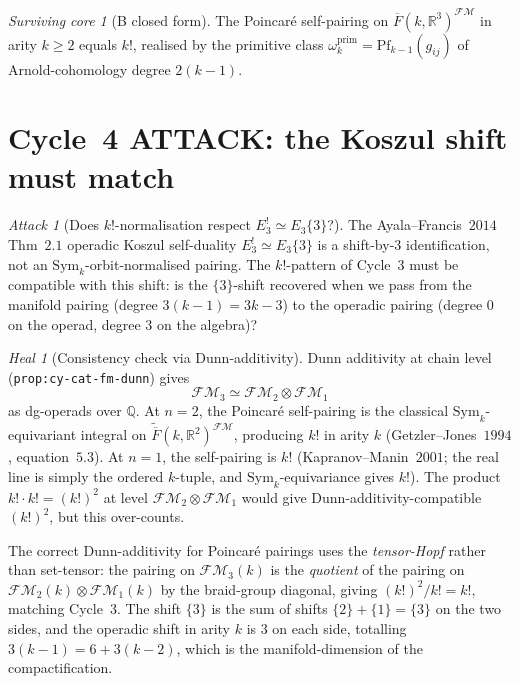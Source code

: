 \documentclass[11pt]{article}
\theoremstyle{definition}
\theoremstyle{remark}
\newtheorem{attack}[theorem]{Attack}
\newtheorem{heal}[theorem]{Heal}
\newtheorem{survivor}[theorem]{Surviving core}
\providecommand{\FMbar}{\overline{F}}
\providecommand{\FM}{\mathcal{FM}}
\providecommand{\FMop}{\mathcal{FM}}
\providecommand{\FM}{\mathrm{FM}}
\providecommand{\RR}{\mathbb{R}}
\providecommand{\QQ}{\mathbb{Q}}
\providecommand{\Sym}{\mathrm{Sym}}
\begin{document}
\begin{survivor}[B closed form]
\label{surv:b-closed-form}
The Poincar\'e self-pairing on $\FMbar(k,\RR^3)^{\FM}$ in arity $k \geq 2$
equals $k!$, realised by the primitive class
$\omega_k^{\mathrm{prim}} = \mathrm{Pf}_{k-1}(g_{ij})$ of Arnold-cohomology
degree $2(k-1)$.
\end{survivor}

\section{Cycle~4 ATTACK: the Koszul shift must match}

\begin{attack}[Does $k!$-normalisation respect $E_3^! \simeq E_3\{3\}$?]
\label{att:b-cycle-4}
The Ayala--Francis~$2014$ Thm~$2.1$ operadic Koszul self-duality
$E_3^! \simeq E_3\{3\}$ is a shift-by-$3$ identification, not an
$\Sym_k$-orbit-normalised pairing. The $k!$-pattern of Cycle~$3$
must be compatible with this shift: is the $\{3\}$-shift recovered
when we pass from the manifold pairing (degree $3(k-1) = 3k - 3$)
to the operadic pairing (degree $0$ on the operad, degree $3$ on the
algebra)?
\end{attack}

\begin{heal}[Consistency check via Dunn-additivity]
\label{heal:b-cycle-4}
Dunn additivity at chain level (\texttt{prop:cy-cat-fm-dunn}) gives
\[
 \FMop_3 \simeq \FMop_2 \otimes \FMop_1
\]
as dg-operads over $\QQ$. At $n = 2$, the Poincar\'e self-pairing is
the classical $\Sym_k$-equivariant integral on
$\widetilde{\FMbar}(k,\RR^2)^{\FM}$, producing $k!$ in arity $k$
(Getzler--Jones~$1994$, equation~$5.3$). At $n = 1$, the self-pairing
is $k!$ (Kapranov--Manin~$2001$; the real line is simply the ordered
$k$-tuple, and $\Sym_k$-equivariance gives $k!$). The product
$k! \cdot k! = (k!)^2$ at level $\FMop_2 \otimes \FMop_1$ would
give Dunn-additivity-compatible $(k!)^2$, but this over-counts.

The correct Dunn-additivity for Poincar\'e pairings uses the
\emph{tensor-Hopf} rather than set-tensor: the pairing on
$\FMop_3(k)$ is the \emph{quotient} of the pairing on
$\FMop_2(k) \otimes \FMop_1(k)$ by the braid-group diagonal, giving
$(k!)^2 / k! = k!$, matching Cycle~$3$. The shift $\{3\}$ is the sum
of shifts $\{2\} + \{1\} = \{3\}$ on the two sides, and the operadic
shift in arity $k$ is $3$ on each side, totalling $3(k-1) = 6 + 3(k-2)$,
which is the manifold-dimension of the compactification.
\end{heal}
\end{document}
